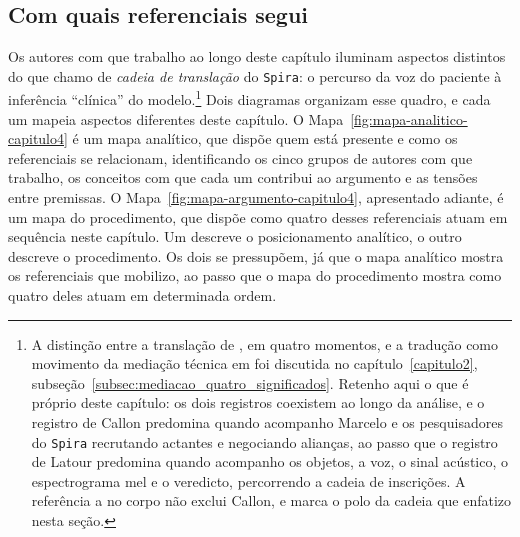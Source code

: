 
\subsection{Com quais referenciais segui}
\label{sec:quadro_analitico}

Os autores com que trabalho ao longo deste capítulo iluminam aspectos distintos do que chamo de \textit{cadeia de translação} \parencite{Latour2017Esperanca} do \texttt{Spira}: o percurso da voz do paciente à inferência \enquote{clínica} do modelo.\footnote{A distinção entre a translação de \textcite{Callon1986Sociology}, em quatro momentos, e a tradução como movimento da mediação técnica em \textcite{Latour2017Esperanca} foi discutida no capítulo~\ref{capitulo2}, subseção~\ref{subsec:mediacao_quatro_significados}. Retenho aqui o que é próprio deste capítulo: os dois registros coexistem ao longo da análise, e o registro de Callon predomina quando acompanho Marcelo e os pesquisadores do \texttt{Spira} recrutando actantes e negociando alianças, ao passo que o registro de Latour predomina quando acompanho os objetos, a voz, o sinal acústico, o espectrograma mel e o veredicto, percorrendo a cadeia de inscrições. A referência a \textcite{Latour2017Esperanca} no corpo não exclui Callon, e marca o polo da cadeia que enfatizo nesta seção.} Dois diagramas organizam esse quadro, e cada um mapeia aspectos diferentes deste capítulo. O Mapa~\ref{fig:mapa-analitico-capitulo4} é um mapa analítico, que dispõe quem está presente e como os referenciais se relacionam, identificando os cinco grupos de autores com que trabalho, os conceitos com que cada um contribui ao argumento e as tensões entre premissas. O Mapa~\ref{fig:mapa-argumento-capitulo4}, apresentado adiante, é um mapa do procedimento, que dispõe como quatro desses referenciais atuam em sequência neste capítulo. Um descreve o posicionamento analítico, o outro descreve o procedimento. Os dois se pressupõem, já que o mapa analítico mostra os referenciais que mobilizo, ao passo que o mapa do procedimento mostra como quatro deles atuam em determinada ordem.

